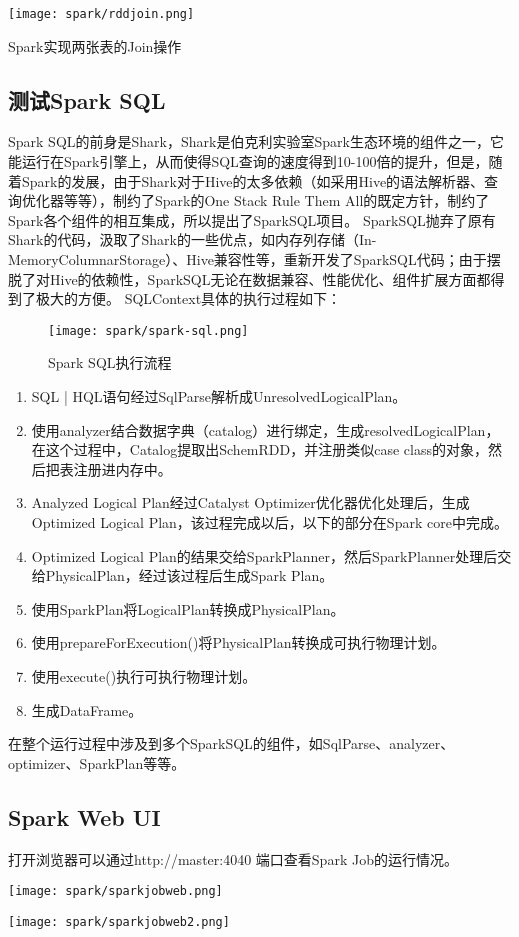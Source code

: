 



\begin{center}
    \texttt{[image: spark/rddjoin.png]}

    Spark实现两张表的Join操作
\end{center}

\subsection{测试Spark SQL}

Spark SQL的前身是Shark，Shark是伯克利实验室Spark生态环境的组件之一，它能运行在Spark引擎上，从而使得SQL查询的速度得到10-100倍的提升，但是，随着Spark的发展，由于Shark对于Hive的太多依赖（如采用Hive的语法解析器、查询优化器等等），制约了Spark的One Stack Rule Them All的既定方针，制约了Spark各个组件的相互集成，所以提出了SparkSQL项目。
SparkSQL抛弃了原有Shark的代码，汲取了Shark的一些优点，如内存列存储（In-MemoryColumnarStorage）、Hive兼容性等，重新开发了SparkSQL代码；由于摆脱了对Hive的依赖性，SparkSQL无论在数据兼容、性能优化、组件扩展方面都得到了极大的方便。
SQLContext具体的执行过程如下：
\begin{figure}[htbp]
    \centering
    \texttt{[image: spark/spark-sql.png]}
    \caption{Spark SQL执行流程}
    \label{fig:spark_sql}
\end{figure}

\begin{enumerate}[1)]
\item SQL | HQL语句经过SqlParse解析成UnresolvedLogicalPlan。
\item 使用analyzer结合数据字典（catalog）进行绑定，生成resolvedLogicalPlan，在这个过程中，Catalog提取出SchemRDD，并注册类似case class的对象，然后把表注册进内存中。
\item Analyzed Logical Plan经过Catalyst Optimizer优化器优化处理后，生成Optimized Logical Plan，该过程完成以后，以下的部分在Spark core中完成。
\item Optimized Logical Plan的结果交给SparkPlanner，然后SparkPlanner处理后交给PhysicalPlan，经过该过程后生成Spark Plan。
\item 使用SparkPlan将LogicalPlan转换成PhysicalPlan。
\item 使用prepareForExecution()将PhysicalPlan转换成可执行物理计划。
\item 使用execute()执行可执行物理计划。
\item 生成DataFrame。
\end{enumerate}
在整个运行过程中涉及到多个SparkSQL的组件，如SqlParse、analyzer、optimizer、SparkPlan等等。
\subsection{Spark Web UI}
打开浏览器可以通过http://master:4040 端口查看Spark Job的运行情况。
\begin{center}
	\texttt{[image: spark/sparkjobweb.png]}

	\texttt{[image: spark/sparkjobweb2.png]}
\end{center}
